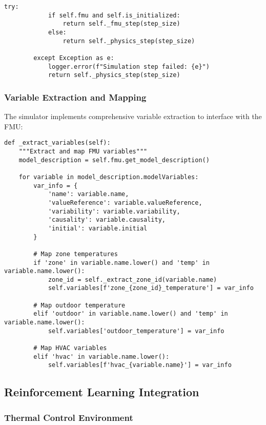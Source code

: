 \documentclass[12pt,a4paper]{article}
\begin{document}
{\begin{lstlisting}[style=python, caption=FMU Simulator Implementation]
        try:
            if self.fmu and self.is_initialized:
                return self._fmu_step(step_size)
            else:
                return self._physics_step(step_size)
                
        except Exception as e:
            logger.error(f"Simulation step failed: {e}")
            return self._physics_step(step_size)
\end{lstlisting}

\subsubsection{Variable Extraction and Mapping}

The simulator implements comprehensive variable extraction to interface with the FMU:

\begin{lstlisting}[style=python, caption=Variable Extraction Implementation]
def _extract_variables(self):
    """Extract and map FMU variables"""
    model_description = self.fmu.get_model_description()
    
    for variable in model_description.modelVariables:
        var_info = {
            'name': variable.name,
            'valueReference': variable.valueReference,
            'variability': variable.variability,
            'causality': variable.causality,
            'initial': variable.initial
        }
        
        # Map zone temperatures
        if 'zone' in variable.name.lower() and 'temp' in variable.name.lower():
            zone_id = self._extract_zone_id(variable.name)
            self.variables[f'zone_{zone_id}_temperature'] = var_info
            
        # Map outdoor temperature
        elif 'outdoor' in variable.name.lower() and 'temp' in variable.name.lower():
            self.variables['outdoor_temperature'] = var_info
            
        # Map HVAC variables
        elif 'hvac' in variable.name.lower():
            self.variables[f'hvac_{variable.name}'] = var_info
\end{lstlisting}

\subsection{Reinforcement Learning Integration}

\subsubsection{Thermal Control Environment}

}
\end{document}
